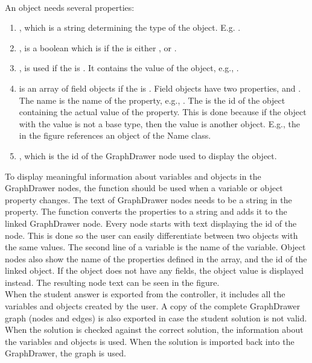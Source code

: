 \\[11pt]
An object needs several properties:
\begin{enumerate}
    \item {}, which is a string determining the type of the object. E.g. .
    \item {}, is a boolean which is  if the  is either ,  or .
    \item {}, is used if the  is . It contains the value of the object, e.g., .
    \item {} is an array of field objects if the  is . Field objects have two properties,  and . The name is the name of the property, e.g., . The  is the id of the object containing the actual value of the property. This is done because if the object with the value is not a base type, then the value is another object. E.g., the  in the figure references an object of the Name class.
    \item {}, which is the id of the GraphDrawer node used to display the object.
\end{enumerate}
To display meaningful information about variables and objects in the GraphDrawer nodes, the  function should be used when a variable or object property changes. The text of GraphDrawer nodes needs to be a string in the  property. The function converts the properties to a string and adds it to the linked GraphDrawer node. Every node starts with text displaying the id of the node. This is done so the user can easily differentiate between two objects with the same values. The second line of a variable is the name of the variable. Object nodes also show the name of the properties defined in the  array, and the id of the linked object. If the object does not have any fields, the object value is displayed instead. The resulting node text can be seen in the figure.
\\[11pt]
When the student answer is exported from the controller, it includes all the variables and objects created by the user. A copy of the complete GraphDrawer graph (nodes and edges) is also exported in case the student solution is not valid. When the solution is checked against the correct solution, the information about the variables and objects is used. When the solution is imported back into the GraphDrawer, the graph is used.
